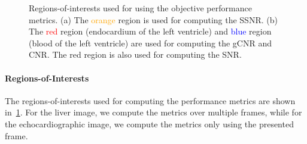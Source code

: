 %
\begin{figure}[h]
  \centering
  \caption{Regions-of-interests used for using the objective performance metrics.
    (a) The \textcolor{orange}{orange} region is used for computing the SSNR.
    (b) The \textcolor{red}{red} region (endocardium of the left ventricle) and \textcolor{blue}{blue} region (blood of the left ventricle) are used for computing the gCNR and CNR.
    The red region is also used for computing the SNR.
  }\label{fig:roi}
\end{figure}
% 
\paragraph{Regions-of-Interests}
The regions-of-interests used for computing the performance metrics are shown in~\cref{fig:roi}.
For the liver image, we compute the metrics over multiple frames, while for the echocardiographic image, we compute the metrics only using the presented frame.

